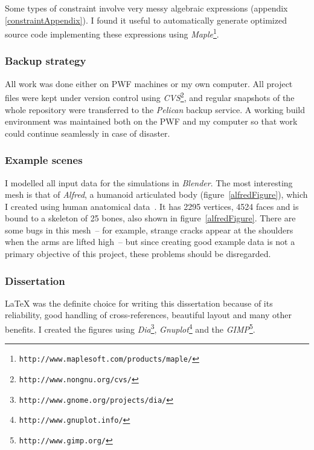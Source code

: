 Some types of constraint involve very messy algebraic expressions
(appendix \ref{constraintAppendix}). I found it useful to automatically generate optimized source
code implementing these expressions using
\textsl{Maple}\footnote{\texttt{http://www.maplesoft.com/products/maple/}}.

\subsubsection{Backup strategy}
All work was done either on PWF machines or my own computer. All project files were kept under
version control using \textsl{CVS}\footnote{\texttt{http://www.nongnu.org/cvs/}}, and regular
snapshots of the whole repository were transferred to the \textsl{Pelican} backup service.
A working build environment was maintained both on the PWF and my computer so that work could
continue seamlessly in case of disaster.

\subsubsection{Example scenes}
I modelled all input data for the simulations in \textsl{Blender}. The most interesting mesh
is that of \emph{Alfred}, a humanoid articulated body (figure~\ref{alfredFigure}), which I created
using human anatomical data~\cite{Anatomy:03}. It has 2295 vertices, 4524 faces and is bound to
a skeleton of 25 bones, also shown in figure~\ref{alfredFigure}. There are some bugs in this
mesh~-- for example, strange cracks appear at the shoulders when the arms are lifted high~-- but
since creating good example data is not a primary objective of this project, these problems
should be disregarded.

\subsubsection{Dissertation}
\LaTeX{} was the definite choice for writing this dissertation because of its reliability,
good handling of cross-references, beautiful layout and many other benefits. I created the
figures using \textsl{Dia}\footnote{\texttt{http://www.gnome.org/projects/dia/}},
\textsl{Gnuplot}\footnote{\texttt{http://www.gnuplot.info/}} and the
\textsl{GIMP}\footnote{\texttt{http://www.gimp.org/}}.

